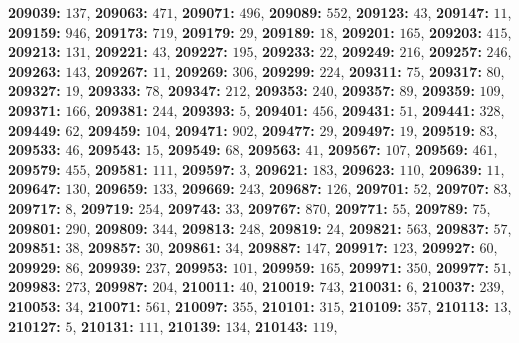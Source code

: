 \textsf{\bfseries 209039:} $137$, \textsf{\bfseries 209063:} $471$, \textsf{\bfseries 209071:} $496$, \textsf{\bfseries 209089:} $552$, \textsf{\bfseries 209123:} $43$, \textsf{\bfseries 209147:} $11$, \textsf{\bfseries 209159:} $946$, \textsf{\bfseries 209173:} $719$, \textsf{\bfseries 209179:} $29$, \textsf{\bfseries 209189:} $18$, \textsf{\bfseries 209201:} $165$, \textsf{\bfseries 209203:} $415$, \textsf{\bfseries 209213:} $131$, \textsf{\bfseries 209221:} $43$, \textsf{\bfseries 209227:} $195$, \textsf{\bfseries 209233:} $22$, \textsf{\bfseries 209249:} $216$, \textsf{\bfseries 209257:} $246$, \textsf{\bfseries 209263:} $143$, \textsf{\bfseries 209267:} $11$, \textsf{\bfseries 209269:} $306$, \textsf{\bfseries 209299:} $224$, \textsf{\bfseries 209311:} $75$, \textsf{\bfseries 209317:} $80$, \textsf{\bfseries 209327:} $19$, \textsf{\bfseries 209333:} $78$, \textsf{\bfseries 209347:} $212$, \textsf{\bfseries 209353:} $240$, \textsf{\bfseries 209357:} $89$, \textsf{\bfseries 209359:} $109$, \textsf{\bfseries 209371:} $166$, \textsf{\bfseries 209381:} $244$, \textsf{\bfseries 209393:} $5$, \textsf{\bfseries 209401:} $456$, \textsf{\bfseries 209431:} $51$, \textsf{\bfseries 209441:} $328$, \textsf{\bfseries 209449:} $62$, \textsf{\bfseries 209459:} $104$, \textsf{\bfseries 209471:} $902$, \textsf{\bfseries 209477:} $29$, \textsf{\bfseries 209497:} $19$, \textsf{\bfseries 209519:} $83$, \textsf{\bfseries 209533:} $46$, \textsf{\bfseries 209543:} $15$, \textsf{\bfseries 209549:} $68$, \textsf{\bfseries 209563:} $41$, \textsf{\bfseries 209567:} $107$, \textsf{\bfseries 209569:} $461$, \textsf{\bfseries 209579:} $455$, \textsf{\bfseries 209581:} $111$, \textsf{\bfseries 209597:} $3$, \textsf{\bfseries 209621:} $183$, \textsf{\bfseries 209623:} $110$, \textsf{\bfseries 209639:} $11$, \textsf{\bfseries 209647:} $130$, \textsf{\bfseries 209659:} $133$, \textsf{\bfseries 209669:} $243$, \textsf{\bfseries 209687:} $126$, \textsf{\bfseries 209701:} $52$, \textsf{\bfseries 209707:} $83$, \textsf{\bfseries 209717:} $8$, \textsf{\bfseries 209719:} $254$, \textsf{\bfseries 209743:} $33$, \textsf{\bfseries 209767:} $870$, \textsf{\bfseries 209771:} $55$, \textsf{\bfseries 209789:} $75$, \textsf{\bfseries 209801:} $290$, \textsf{\bfseries 209809:} $344$, \textsf{\bfseries 209813:} $248$, \textsf{\bfseries 209819:} $24$, \textsf{\bfseries 209821:} $563$, \textsf{\bfseries 209837:} $57$, \textsf{\bfseries 209851:} $38$, \textsf{\bfseries 209857:} $30$, \textsf{\bfseries 209861:} $34$, \textsf{\bfseries 209887:} $147$, \textsf{\bfseries 209917:} $123$, \textsf{\bfseries 209927:} $60$, \textsf{\bfseries 209929:} $86$, \textsf{\bfseries 209939:} $237$, \textsf{\bfseries 209953:} $101$, \textsf{\bfseries 209959:} $165$, \textsf{\bfseries 209971:} $350$, \textsf{\bfseries 209977:} $51$, \textsf{\bfseries 209983:} $273$, \textsf{\bfseries 209987:} $204$, \textsf{\bfseries 210011:} $40$, \textsf{\bfseries 210019:} $743$, \textsf{\bfseries 210031:} $6$, \textsf{\bfseries 210037:} $239$, \textsf{\bfseries 210053:} $34$, \textsf{\bfseries 210071:} $561$, \textsf{\bfseries 210097:} $355$, \textsf{\bfseries 210101:} $315$, \textsf{\bfseries 210109:} $357$, \textsf{\bfseries 210113:} $13$, \textsf{\bfseries 210127:} $5$, \textsf{\bfseries 210131:} $111$, \textsf{\bfseries 210139:} $134$, \textsf{\bfseries 210143:} $119$, 
